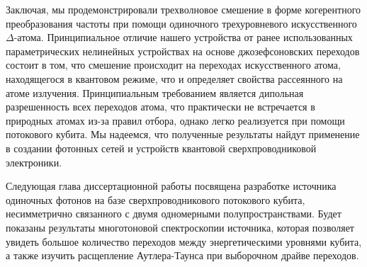Заключая, мы продемонстрировали трехволновое смешение в форме когерентного преобразования частоты при помощи одиночного трехуровневого искусственного $\Delta$-атома. Принципиальное отличие нашего устройства от ранее использованных параметрических нелинейных устройствах на основе джозефсоновских переходов состоит в том, что смешение происходит на переходах искусственного атома, находящегося в квантовом режиме, что и определяет свойства рассеянного на атоме излучения. Принципиальным требованием является дипольная разрешенность всех переходов атома, что практически не встречается в природных атомах из-за правил отбора, однако легко реализуется при помощи потокового кубита. Мы надеемся, что полученные результаты найдут применение в создании фотонных сетей и устройств квантовой сверхпроводниковой электроники. 

Следующая глава диссертационной работы посвящена разработке источника одиночных фотонов на базе сверхпроводникового потокового кубита, несимметрично связанного с двумя одномерными полупространствами. Будет показаны результаты многотоновой спектроскопии источника, которая позволяет увидеть большое количество переходов между энергетическими уровнями кубита, а также изучить расщепление Аутлера-Таунса при выборочном драйве переходов. 
 

